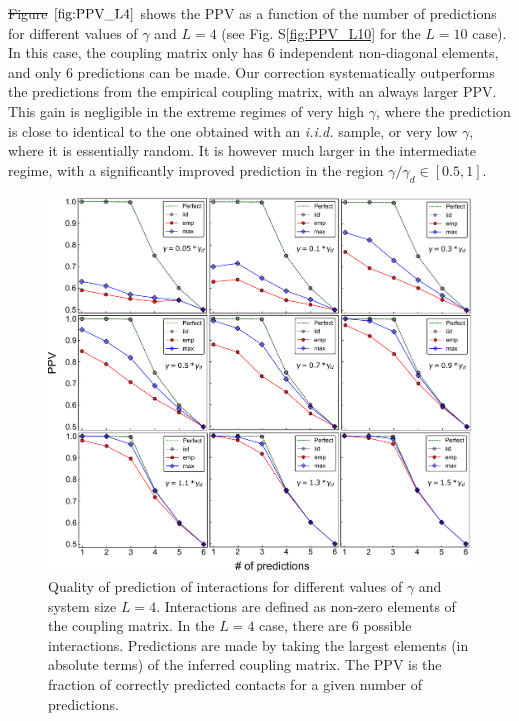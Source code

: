 \documentclass[preprint,amsmath,amssymb,superscriptaddress,showpacs,pre]{revtex4-1}
\newcommand{\sref}[1]{S\ref{#1}}
\providecommand{\DIFadd}[1]{{\protect\color{blue}\uwave{#1}}} %
\providecommand{\DIFdel}[1]{{\protect\color{red}\sout{#1}}}                      %
\providecommand{\DIFaddbegin}{} %
\providecommand{\DIFaddend}{} %
\providecommand{\DIFdelbegin}{} %
\providecommand{\DIFdelend}{} %
\providecommand{\DIFaddbeginFL}{} %
\providecommand{\DIFaddendFL}{} %
\providecommand{\DIFdelbeginFL}{} %
\providecommand{\DIFdelendFL}{} %
\newcommand{\DIFscaledelfig}{0.5}
\newlength{\DIFdelgraphicswidth} %
\newlength{\DIFdelgraphicsheight} %
\newcommand{\DIFaddincludegraphics}[2][]{{\color{blue}\fbox{\DIFOincludegraphics[#1]{#2}}}} %
\newcommand{\DIFdelincludegraphics}[2][]{%
\sbox{\DIFdelgraphicsbox}{\DIFOincludegraphics[#1]{#2}}%
\settoboxwidth{\DIFdelgraphicswidth}{\DIFdelgraphicsbox} %
\settoboxtotalheight{\DIFdelgraphicsheight}{\DIFdelgraphicsbox} %
\scalebox{\DIFscaledelfig}{%
\parbox[b]{\DIFdelgraphicswidth}{\usebox{\DIFdelgraphicsbox}\\[-\baselineskip] \rule{\DIFdelgraphicswidth}{0em}}\llap{\resizebox{\DIFdelgraphicswidth}{\DIFdelgraphicsheight}{%
\setlength{\unitlength}{\DIFdelgraphicswidth}%
\begin{picture}(1,1)%
\thicklines\linethickness{2pt} %
{\color[rgb]{1,0,0}\put(0,0){\framebox(1,1){}}}%
{\color[rgb]{1,0,0}\put(0,0){\line( 1,1){1}}}%
{\color[rgb]{1,0,0}\put(0,1){\line(1,-1){1}}}%
\end{picture}%
}\hspace*{3pt}}} %
} %
\DeclareRobustCommand{\DIFaddbegin}{\DIFOaddbegin \let\includegraphics\DIFaddincludegraphics} %
\DeclareRobustCommand{\DIFaddend}{\DIFOaddend \let\includegraphics\DIFOincludegraphics} %
\DeclareRobustCommand{\DIFdelbegin}{\DIFOdelbegin \let\includegraphics\DIFdelincludegraphics} %
\DeclareRobustCommand{\DIFdelend}{\DIFOaddend \let\includegraphics\DIFOincludegraphics} %
\DeclareRobustCommand{\DIFaddbeginFL}{\DIFOaddbeginFL \let\includegraphics\DIFaddincludegraphics} %
\DeclareRobustCommand{\DIFaddendFL}{\DIFOaddendFL \let\includegraphics\DIFOincludegraphics} %
\DeclareRobustCommand{\DIFdelbeginFL}{\DIFOdelbeginFL \let\includegraphics\DIFdelincludegraphics} %
\DeclareRobustCommand{\DIFdelendFL}{\DIFOaddendFL \let\includegraphics\DIFOincludegraphics} %
\begin{document}
\DIFdelbegin \DIFdel{Figure }\DIFdelend \DIFaddbegin \DIFadd{Fig.~}\DIFaddend $\ref{fig:PPV_L4}$ shows the PPV as a function of the number of predictions for different values of $\gamma$ and $L=4$ (see Fig. \sref{fig:PPV_L10} for the $L=10$ case). 
In this case, the coupling matrix only has $6$ independent non-diagonal elements, and only 6 predictions can be made. 
Our correction systematically outperforms the predictions from the empirical coupling matrix, with an always larger PPV. 
This gain is negligible in the extreme regimes of very high $\gamma$, where the prediction is close to identical to the one obtained with an \emph{i.i.d.} sample, or very low $\gamma$, where it is essentially random. 
It is however much larger in the intermediate regime, with a significantly improved prediction in the region $\gamma/\gamma_d\in[0.5,1]$.


\begin{figure}[!htb]
	\centering
	\DIFdelbeginFL %
\DIFdelendFL \DIFaddbeginFL \includegraphics[keepaspectratio=true,width=1.0\textwidth]{Figures/PPVs_L4.pdf}
	\DIFaddendFL \caption{Quality of prediction of interactions for  different values of $\gamma$ and system size $L=4$. Interactions are defined as non-zero elements of the coupling matrix. In the $L=4$ case, there are $6$ possible interactions. Predictions are made by taking the largest elements (in absolute terms) of the inferred coupling matrix. The PPV is the fraction of correctly predicted contacts for a given number of predictions.}
	\label{fig:PPV_L4}
\end{figure}
\end{document}
